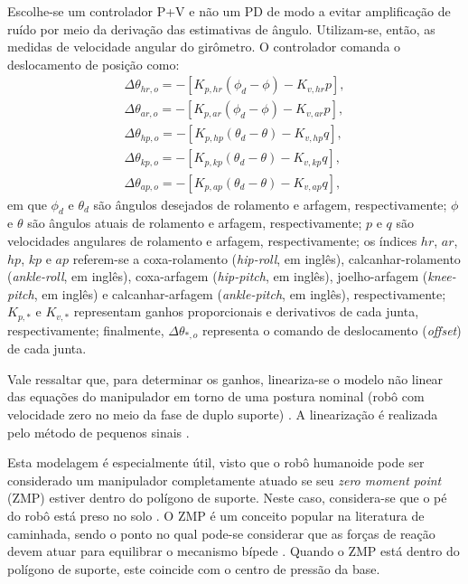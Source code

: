 Escolhe-se um controlador P+V e não um PD de modo a evitar amplificação de ruído por meio da derivação das estimativas de ângulo. Utilizam-se, então, as medidas de velocidade angular do girômetro. O controlador comanda o deslocamento de posição como:
\begin{align}
\Delta \theta_{hr,o} = - \left[ K_{p,hr} \left( \phi_d - \phi \right) - K_{v,hr} p \right], \\
\Delta \theta_{ar,o} = - \left[ K_{p,ar} \left( \phi_d - \phi \right) - K_{v,ar} p \right], \\
\Delta \theta_{hp,o} = - \left[ K_{p,hp} \left( \theta_d - \theta \right) - K_{v,hp} q \right], \\
\Delta \theta_{kp,o} = - \left[ K_{p,kp} \left( \theta_d - \theta \right) - K_{v,kp} q \right], \\
\Delta \theta_{ap,o} = - \left[ K_{p,ap} \left( \theta_d - \theta \right) - K_{v,ap} q \right],
\end{align}
em que \( \phi_d \) e \( \theta_d \) são ângulos desejados de rolamento e arfagem, respectivamente; \( \phi \) e \( \theta \) são ângulos atuais de rolamento e arfagem, respectivamente; \( p \) e \( q \) são velocidades angulares de rolamento e arfagem, respectivamente; os índices \( hr \), \( ar \), \( hp \), \( kp \) e \( ap \) referem-se a coxa-rolamento (\textit{hip-roll}, em inglês), calcanhar-rolamento (\textit{ankle-roll}, em inglês), coxa-arfagem (\textit{hip-pitch}, em inglês), joelho-arfagem (\textit{knee-pitch}, em inglês) e calcanhar-arfagem (\textit{ankle-pitch}, em inglês), respectivamente; \( K_{p,*} \) e \( K_{v,*} \) representam ganhos proporcionais e derivativos de cada junta, respectivamente; finalmente, \( \Delta \theta_{*,o} \) representa o comando de deslocamento (\emph{offset}) de cada junta.

Vale ressaltar que, para determinar os ganhos, lineariza-se o modelo não linear das equações do manipulador em torno de uma postura nominal (robô com velocidade zero no meio da fase de duplo suporte) \cite{tesemarcos}. A linearização é realizada pelo método de pequenos sinais \cite{franklin2013}. 

Esta modelagem é especialmente útil, visto que o robô humanoide pode ser considerado um manipulador completamente atuado se seu \textit{zero moment point} (ZMP) estiver dentro do polígono de suporte. Neste caso, considera-se que o pé do robô está preso no solo \cite{vukobratovic2004}. O ZMP é um conceito popular na literatura de caminhada, sendo o ponto no qual pode-se considerar que as forças de reação devem atuar para equilibrar o mecanismo bípede \cite{vukobratovic2004}. Quando o ZMP está dentro do polígono de suporte, este coincide com o centro de pressão da base.

